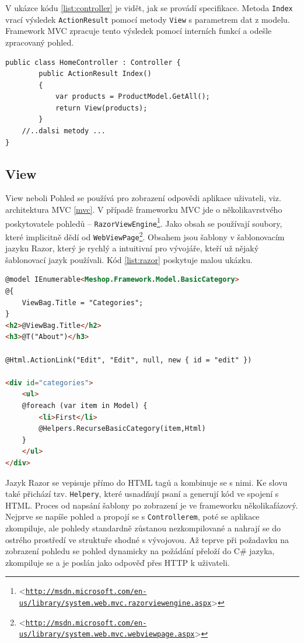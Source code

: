 \documentclass[11pt,twoside,a4paper]{book}
\let\oldUrl\url
\renewcommand\url[1]{<\texttt{\oldUrl{#1}}>}
\begin{document}
V ukázce kódu \ref{list:controller} je vidět, jak se provádí specifikace. Metoda \texttt{Index} vrací výsledek \texttt{ActionResult} pomocí metody \texttt{View} s parametrem dat z modelu. Framework MVC zpracuje tento výsledek pomocí interních funkcí a odešle zpracovaný pohled. 

\begin{lstlisting}[float=h!,language=CSharp, caption={Controller}, label=list:controller]
public class HomeController : Controller {  
        public ActionResult Index()
        {
            var products = ProductModel.GetAll();
            return View(products);
        }
	//..dalsi metody ...        
}
\end{lstlisting}

\subsection{View}
\label{sec:views}
View neboli \textsf{Pohled} se používá pro zobrazení odpovědi aplikace uživateli, viz. architektura MVC \ref{mvc}. V případě frameworku MVC jde o několikavrstvého poskytovatele pohledů -- \texttt{RazorViewEngine}\footnote{\url{http://msdn.microsoft.com/en-us/library/system.web.mvc.razorviewengine.aspx}}. Jako obsah se používají soubory, které implicitně dědí od \texttt{WebViewPage}\footnote{\url{http://msdn.microsoft.com/en-us/library/system.web.mvc.webviewpage.aspx}}. Obsahem jsou šablony v šablonovacím jazyku \textsf{Razor}, který je rychlý a intuitivní pro vývojáře, kteří už nějaký šablonovací jazyk používali. Kód \ref{list:razor} poskytuje malou ukázku. 

\begin{lstlisting}[float,language=HTML, caption={Pohled s jazykem Razor}, label=list:razor]
@model IEnumerable<Meshop.Framework.Model.BasicCategory>
@{
    ViewBag.Title = "Categories";
}
<h2>@ViewBag.Title</h2>
<h3>@T("About")</h3>

@Html.ActionLink("Edit", "Edit", null, new { id = "edit" })

<div id="categories">
	<ul>
	@foreach (var item in Model) {
		<li>First</li>
    	@Helpers.RecurseBasicCategory(item,Html)          
	}
	</ul>
</div>
\end{lstlisting}

Jazyk \textsf{Razor} se vepisuje přímo do HTML tagů a kombinuje se s nimi. Ke slovu také přichází tzv. \texttt{Helpery}, které usnadňují psaní a generují kód ve spojení s HTML. Proces od napsání šablony po zobrazení je ve frameworku několikafázový. Nejprve se napíše pohled a propojí se s \texttt{Controllerem}, poté se aplikace zkompiluje, ale pohledy standardně zůstanou nezkompilované a nahrají se do ostrého prostředí ve struktuře shodné s vývojovou. Až teprve při požadavku na zobrazení pohledu se pohled dynamicky na požádání přeloží do C\# jazyka, zkompiluje se a je poslán jako odpověď přes HTTP k uživateli. 
\end{document}
